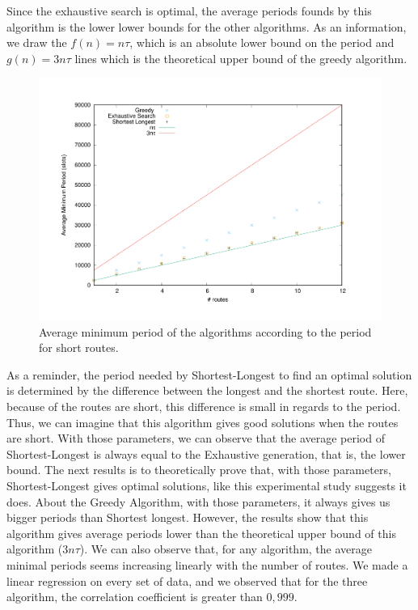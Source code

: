 \documentclass[a4paper,10pt]{article}
\begin{document}
       
%       
%       
           
      
      Since the exhaustive search is optimal, the average periods founds by this algorithm is the lower lower bounds for the other algorithms.
      As an information, we draw the $f(n) = n\tau$, which is an absolute lower bound on the period and $g(n) = 3n\tau$ lines which is the theoretical upper bound of the greedy algorithm.
        
        \begin{figure}

      \begin{center}
      \includegraphics[scale=0.4]{periode_petite.pdf}
      \end{center}
     \caption{Average minimum period of the algorithms according to the period for short routes.}
\end{figure}
      
      As a reminder, the period needed by Shortest-Longest to find an optimal solution is determined by the difference between the longest and the shortest route. Here, because of the routes are short, this difference is small in regards to the period. Thus, we can imagine that this algorithm gives good solutions when the routes are short.
      With those parameters, we can observe that the average period of Shortest-Longest is always equal to the Exhaustive generation, that is, the lower bound.
      The next results is to theoretically prove that, with those parameters, Shortest-Longest gives optimal solutions, like this experimental study suggests it does. 
      About the Greedy Algorithm, with those parameters, it always gives us bigger periods than Shortest longest. However, the results show that this algorithm gives average periods lower than the theoretical upper bound of this algorithm ($3n\tau$).
      We can also observe that, for any algorithm, the average minimal periods seems increasing linearly with the number of routes. We made a linear regression on every set of data, and we observed that for the three algorithm, the correlation coefficient is greater than $0,999$.
\end{document}
